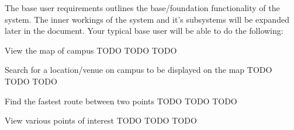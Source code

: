 The base user requirements outlines the base/foundation functionality of the system. The inner workings of the system and it's subsystems will be expanded later in the document. Your typical base user will be able to do the following:

\FuncReq
{View the map of campus}
{TODO}
{TODO}
{TODO}

\FuncReq
{Search for a location/venue on campus to be displayed on the map}
{TODO}
{TODO}
{TODO}

\FuncReq
{Find the fastest route between two points}%
{TODO}
{TODO}
{TODO}

\FuncReq
{View various points of interest}
{TODO}
{TODO}
{TODO}
